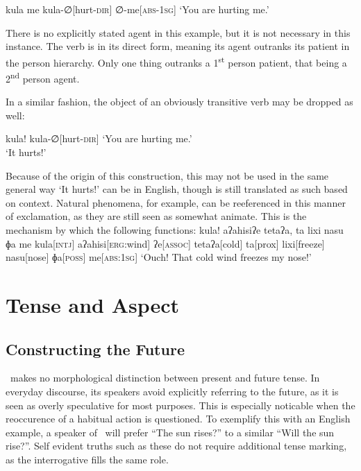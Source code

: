 \ex
\begingl
\glpreamble kula me
\endpreamble
kula-∅[hurt-\textsc{dir}]
∅-me[\textsc{abs-1sg}]
\glft `You are hurting me.'
\endgl
\xe

There is no explicitly stated agent in this example, but it is not necessary in this instance.
The verb  is in its direct form, meaning its agent outranks its patient in the person hierarchy.
Only one thing outranks a 1\textsuperscript{st} person patient, that being a 2\textsuperscript{nd} person agent.

In a similar fashion, the object of an obviously transitive verb may be dropped as well:

\ex
\begingl
\glpreamble kula!
\endpreamble
kula-∅[hurt-\textsc{dir}]
\glft `You are hurting me.'\\`It hurts!'
\endgl
\xe

Because of the origin of this construction, this may not be used in the same general way `It hurts!' can be in English, though  is still translated as such based on context.
Natural phenomena, for example, can be reeferenced in this manner of exclamation, as they are still seen as somewhat animate.
This is the mechanism by which the following functions:
\ex
\begingl
\glpreamble kula! aʔahisiʔe tetaʔa, ta lixi nasu ɸa me\endpreamble
kula[\textsc{intj}]
aʔahisi[\textsc{erg:}wind]
ʔe[\textsc{assoc}]
tetaʔa[cold]
ta[prox]
lixi[freeze]
nasu[nose]
ɸa[\textsc{poss}]
me[\textsc{abs:1sg}]
\glft `Ouch! That cold wind freezes my nose!'
\endgl
\xe


\section{Tense and Aspect}
\subsection{Constructing the Future}

\langname\ makes no morphological distinction between present and future tense.
In everyday discourse, its speakers avoid explicitly referring to the future, as it is seen as overly speculative for most purposes.
This is especially noticable when the reoccurence of a habitual action is questioned.
To exemplify this with an English example, a speaker of \langname\ will prefer ``The sun rises?'' to a similar ``Will the sun rise?''.
Self evident truths such as these do not require additional tense marking, as the interrogative fills the same role.

